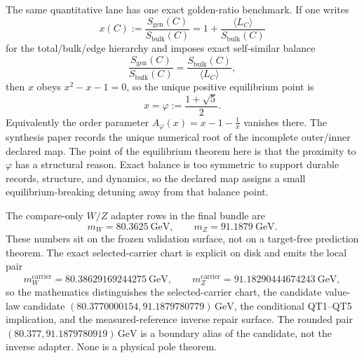 \documentclass[11pt]{article}
\begin{document}
The same quantitative lane has one exact golden-ratio benchmark. If one writes
\[
x(C):=\frac{S_{\mathrm{gen}}(C)}{S_{\mathrm{bulk}}(C)}
=
1+\frac{\langle L_C\rangle}{S_{\mathrm{bulk}}(C)}
\]
for the total/bulk/edge hierarchy and imposes exact self-similar balance
\[
\frac{S_{\mathrm{gen}}(C)}{S_{\mathrm{bulk}}(C)}
=
\frac{S_{\mathrm{bulk}}(C)}{\langle L_C\rangle},
\]
then \(x\) obeys \(x^2-x-1=0\), so the unique positive equilibrium point is
\[
x=\varphi:=\frac{1+\sqrt5}{2}.
\]
Equivalently the order parameter \(A_\varphi(x)=x-1-\frac1x\) vanishes there. The synthesis paper
records the unique numerical root of the incomplete outer/inner declared map. The point of
the equilibrium theorem here is that the proximity to \(\varphi\) has a structural reason. Exact
balance is too symmetric to support durable records, structure, and dynamics, so the declared map
assigns a small
equilibrium-breaking detuning away from that balance point.

The compare-only \(W/Z\) adapter rows in the final bundle are
\[
m_W = 80.3625~\mathrm{GeV},
\qquad
m_Z = 91.1879~\mathrm{GeV}.
\]
These numbers sit on the frozen validation surface, not on a target-free prediction theorem.
The exact selected-carrier chart is explicit on disk and emits
the local pair
\[
m_W^{\mathrm{carrier}} = 80.38629169244275~\mathrm{GeV},
\qquad
m_Z^{\mathrm{carrier}} = 91.18290444674243~\mathrm{GeV},
\]
so the mathematics distinguishes the selected-carrier chart, the candidate
value-law candidate \((80.3770000154,91.1879780779)\,\mathrm{GeV}\), the
conditional QT1--QT5 implication, and the measured-reference inverse repair surface.
The rounded pair \((80.377,91.1879780919)\,\mathrm{GeV}\) is a boundary alias
of the candidate, not the inverse adapter. None is a physical pole theorem.
\end{document}
